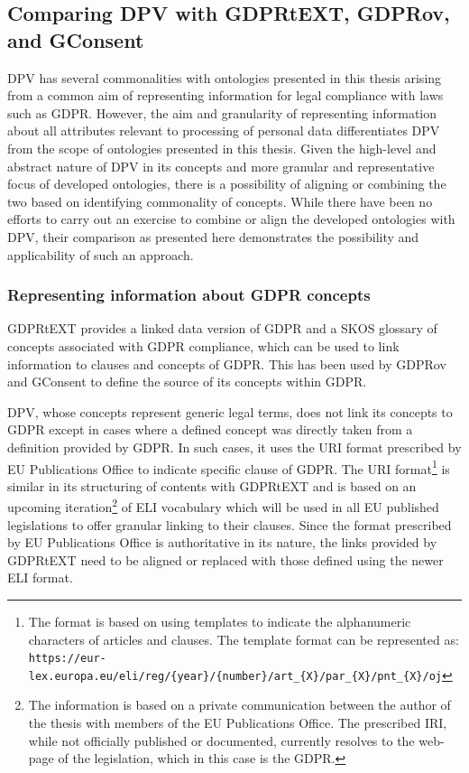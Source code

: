 \subsection{Comparing DPV with GDPRtEXT, GDPRov, and GConsent}
DPV has several commonalities with ontologies presented in this thesis arising from a common aim of representing information for legal compliance with laws such as GDPR.
However, the aim and granularity of representing information about all attributes relevant to processing of personal data differentiates DPV from the scope of ontologies presented in this thesis.
Given the high-level and abstract nature of DPV in its concepts and more granular and representative focus of developed ontologies, there is a possibility of aligning or combining the two based on identifying commonality of concepts.
While there have been no efforts to carry out an exercise to combine or align the developed ontologies with DPV, their comparison as presented here demonstrates the possibility and applicability of such an approach.

\subsubsection{Representing information about GDPR concepts}
GDPRtEXT provides a linked data version of GDPR and a SKOS glossary of concepts associated with GDPR compliance, which can be used to link information to clauses and concepts of GDPR.
This has been used by GDPRov and GConsent to define the source of its concepts within GDPR.

DPV, whose concepts represent generic legal terms, does not link its concepts to GDPR except in cases where a defined concept was directly taken from a definition provided by GDPR.
In such cases, it uses the URI format prescribed by EU Publications Office to indicate specific clause of GDPR. The URI format\footnote{The format is based on using templates to indicate the alphanumeric characters of articles and clauses. The template format can be represented as: \texttt{https://eur-lex.europa.eu/eli/reg/\{year\}/\{number\}/art\_\{X\}/par\_\{X\}/pnt\_\{X\}/oj}} is similar in its structuring of contents with GDPRtEXT and is based on an upcoming iteration\footnote{The information is based on a private communication between the author of the thesis with members of the EU Publications Office. The prescribed IRI, while not officially published or documented, currently resolves to the web-page of the legislation, which in this case is the GDPR.} of ELI vocabulary which will be used in all EU published legislations to offer granular linking to their clauses.
Since the format prescribed by EU Publications Office is authoritative in its nature, the links provided by GDPRtEXT need to be aligned or replaced with those defined using the newer ELI format.

